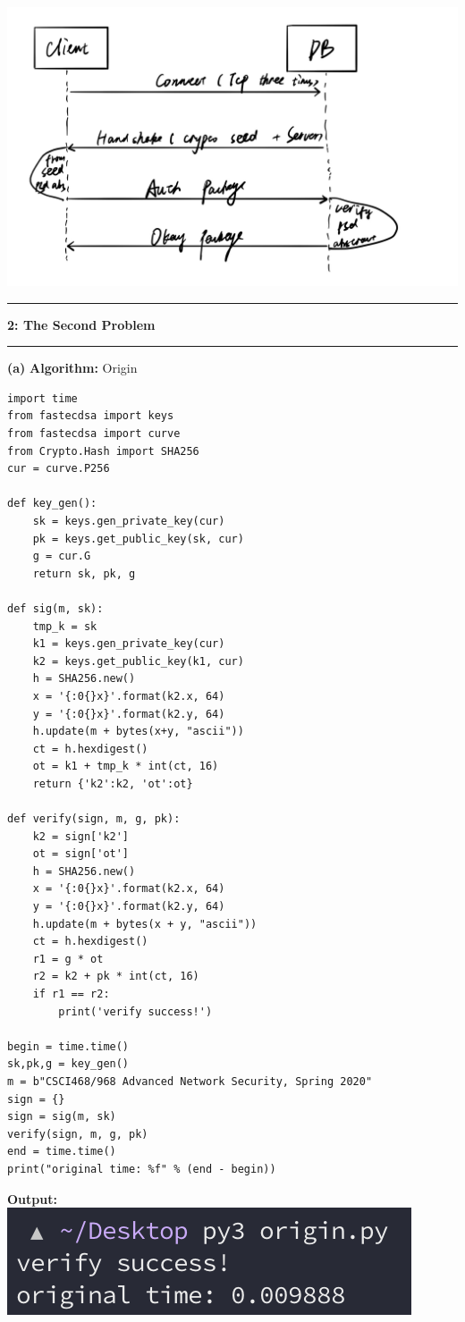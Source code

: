 \documentclass[11pt]{article}
\newcommand\question[2]{\vspace{.25in}\hrule\textbf{#1: #2}\vspace{.5em}\hrule\vspace{.10in}}
\renewcommand\part[1]{\vspace{.10in}\textbf{(#1)}}
\newcommand\al{\vspace{.10in}\textbf{Algorithm: }}
\newcommand\ot{\vspace{.10in}\textbf{Output: }}
\begin{document}
\includegraphics[scale=0.3]{f1.jpeg}


\question{2}{The Second Problem}

\part{a} \al Origin \\ 
\begin{lstlisting}
import time
from fastecdsa import keys
from fastecdsa import curve
from Crypto.Hash import SHA256
cur = curve.P256

def key_gen():
    sk = keys.gen_private_key(cur)
    pk = keys.get_public_key(sk, cur)
    g = cur.G
    return sk, pk, g

def sig(m, sk):
    tmp_k = sk
    k1 = keys.gen_private_key(cur)
    k2 = keys.get_public_key(k1, cur)
    h = SHA256.new()
    x = '{:0{}x}'.format(k2.x, 64)
    y = '{:0{}x}'.format(k2.y, 64)
    h.update(m + bytes(x+y, "ascii"))
    ct = h.hexdigest()
    ot = k1 + tmp_k * int(ct, 16)
    return {'k2':k2, 'ot':ot}

def verify(sign, m, g, pk):
    k2 = sign['k2']
    ot = sign['ot']
    h = SHA256.new()
    x = '{:0{}x}'.format(k2.x, 64)
    y = '{:0{}x}'.format(k2.y, 64)
    h.update(m + bytes(x + y, "ascii"))
    ct = h.hexdigest()
    r1 = g * ot
    r2 = k2 + pk * int(ct, 16)
    if r1 == r2:
        print('verify success!')

begin = time.time()
sk,pk,g = key_gen()
m = b"CSCI468/968 Advanced Network Security, Spring 2020"
sign = {}
sign = sig(m, sk)
verify(sign, m, g, pk)
end = time.time()
print("original time: %f" % (end - begin))
\end{lstlisting}

\ot\\
\includegraphics{ot1.png}
\end{document}
